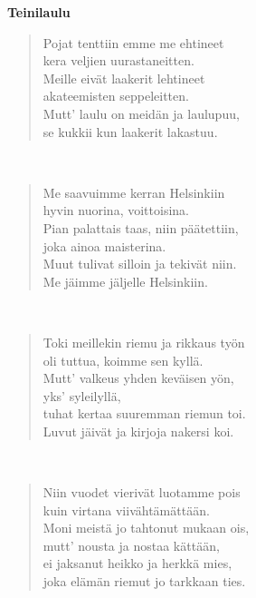\noindent\begin{minipage}{\linewidth}
\vspace{5pt}
\parbox[t]{0.85\linewidth}{\raggedright {\large\bf Teinilaulu}\\[6pt]}
\begin{verse}
	Pojat tenttiin emme me ehtineet\\
	kera veljien uurastaneitten.\\
	Meille eivät laakerit lehtineet\\
	akateemisten seppeleitten.\\
	Mutt' laulu on meidän ja laulupuu,\\
	se kukkii kun laakerit lakastuu.\\
\end{verse}
\end{minipage}\\[10pt]
\noindent\begin{minipage}{\linewidth}
\begin{verse}
	Me saavuimme kerran Helsinkiin\\
	hyvin nuorina, voittoisina.\\
	Pian palattais taas, niin päätettiin,\\
	joka ainoa maisterina.\\
	Muut tulivat silloin ja tekivät niin.\\
	Me jäimme jäljelle Helsinkiin.\\
\end{verse}
\end{minipage}\\[10pt]
\noindent\begin{minipage}{\linewidth}
\begin{verse}
	Toki meillekin riemu ja rikkaus työn\\
	oli tuttua, koimme sen kyllä.\\
	Mutt' valkeus yhden keväisen yön,\\
	yks' syleilyllä,\\
	tuhat kertaa suuremman riemun toi.\\
	Luvut jäivät ja kirjoja nakersi koi.\\
\end{verse}
\end{minipage}\\[10pt]
\noindent\begin{minipage}{\linewidth}
\begin{verse}
	Niin vuodet vierivät luotamme pois\\
	kuin virtana viivähtämättään.\\
	Moni meistä jo tahtonut mukaan ois,\\
	mutt' nousta ja nostaa kättään,\\
	ei jaksanut heikko ja herkkä mies,\\
	joka elämän riemut jo tarkkaan ties.\\
\end{verse}
\end{minipage}\\[10pt]
